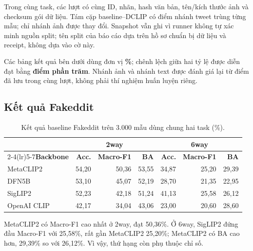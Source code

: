 \documentclass[12pt,a4paper]{article}
\begin{document}
Trong cùng task, các lượt có cùng ID, nhãn, hash văn bản, tên/kích thước ảnh và checksum gói dữ liệu. Tám cặp baseline--DCLIP có điểm nhánh tweet trùng từng mẫu; chỉ nhánh ảnh được thay đổi. Snapshot vẫn ghi  vì runner không tự xác minh nguồn split; tên split của báo cáo dựa trên hồ sơ chuẩn bị dữ liệu và receipt, không dựa vào cờ này.

Các bảng kết quả bên dưới dùng đơn vị \textbf{\%}; chênh lệch giữa hai tỷ lệ được diễn đạt bằng \textbf{điểm phần trăm}. Nhánh ảnh và nhánh text được đánh giá lại từ điểm đã lưu trong cùng lượt, không phải thí nghiệm huấn luyện riêng.

\subsection{Kết quả Fakeddit}
\begin{table}[H]\centering\small
\caption{Kết quả baseline Fakeddit trên 3.000 mẫu dùng chung hai task (\%).}\label{tab:fk-results}
\begin{tabular}{lrrrrrr}\toprule
&\multicolumn{3}{c}{\textbf{2way}}&\multicolumn{3}{c}{\textbf{6way}}\\\cmidrule(lr){2-4}\cmidrule(lr){5-7}\textbf{Backbone}&\textbf{Acc.}&\textbf{Macro-F1}&\textbf{BA}&\textbf{Acc.}&\textbf{Macro-F1}&\textbf{BA}\\\midrule
MetaCLIP2&54,20&50,36&53,55&34,87&25,20&29,39\\
DFN5B&53,10&45,07&52,19&28,70&21,35&22,95\\
SigLIP2&52,23&42,18&51,24&41,13&25,58&26,12\\
OpenAI CLIP&42,17&34,04&43,06&23,00&20,60&28,60\\
\bottomrule\end{tabular}\end{table}

MetaCLIP2 có Macro-F1 cao nhất ở 2way, đạt 50,36\%. Ở 6way, SigLIP2 đứng đầu Macro-F1 với 25,58\%, rất gần MetaCLIP2 25,20\%; MetaCLIP2 có BA cao hơn, 29,39\% so với 26,12\%. Vì vậy, thứ hạng còn phụ thuộc chỉ số.
\end{document}
